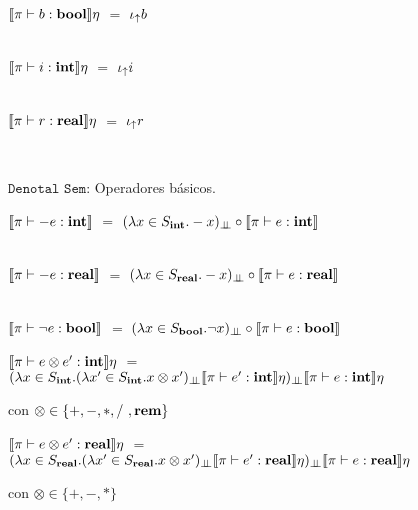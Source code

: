 \begin{center}
$\llbracket \pi \vdash b : \textbf{bool} \rrbracket \eta$ $=$ $\iota_{\uparrow} b$\\

\

$\llbracket \pi \vdash i : \textbf{int} \rrbracket \eta$  $=$ $\iota_{\uparrow} i$\\

\

$\llbracket \pi \vdash r : \textbf{real} \rrbracket \eta$ $=$ $\iota_{\uparrow} r$
\end{center}
\

\noindent
$\texttt{Denotal Sem:}$ Operadores b\'asicos.\

\begin{center}

$\llbracket \pi \vdash -e : \textbf{int} \rrbracket$ $=$ $(\lambda x \in S_{\textbf{int}} . -x)_{\bot \!\!\! \bot} \circ \llbracket \pi \vdash e : \textbf{int} \rrbracket$\\

\

$\llbracket \pi \vdash -e : \textbf{real} \rrbracket$ $=$ $(\lambda x \in S_{\textbf{real}} . -x)_{\bot \!\!\! \bot} \circ \llbracket \pi \vdash e : \textbf{real} \rrbracket$\\

\

$\llbracket \pi \vdash \neg e : \textbf{bool} \rrbracket$ $=$ $(\lambda x \in S_{\textbf{bool}} . \neg x)_{\bot \!\!\! \bot} \circ \llbracket \pi \vdash e : \textbf{bool} \rrbracket$

\end{center}

\noindent
$\llbracket \pi \vdash e \otimes e' : \textbf{int} \rrbracket\eta$ $=$ \\
				\indent \indent \indent $(\lambda x \in S_{\textbf{int}} . 
											(\lambda x' \in S_{\textbf{int}} . x \otimes x')_{\bot \!\!\! \bot}
													\llbracket \pi \vdash e' : \textbf{int} \rrbracket\eta)_{\bot \!\!\! \bot}
														\llbracket \pi \vdash e : \textbf{int} \rrbracket\eta$

\begin{center}
con $\otimes \in \{+,-,*,/\ , \textbf{rem}\}$
\end{center}

\noindent
$\llbracket \pi \vdash e \otimes e' : \textbf{real} \rrbracket\eta$ $=$ \\
				\indent \indent \indent $(\lambda x \in S_{\textbf{real}} . 
											(\lambda x' \in S_{\textbf{real}} . x \otimes x')_{\bot \!\!\! \bot}
													\llbracket \pi \vdash e' : \textbf{real} \rrbracket\eta)_{\bot \!\!\! \bot}
														\llbracket \pi \vdash e : \textbf{real} \rrbracket\eta$

\begin{center}
con $\otimes \in \{+,-,*\}$
\end{center}

